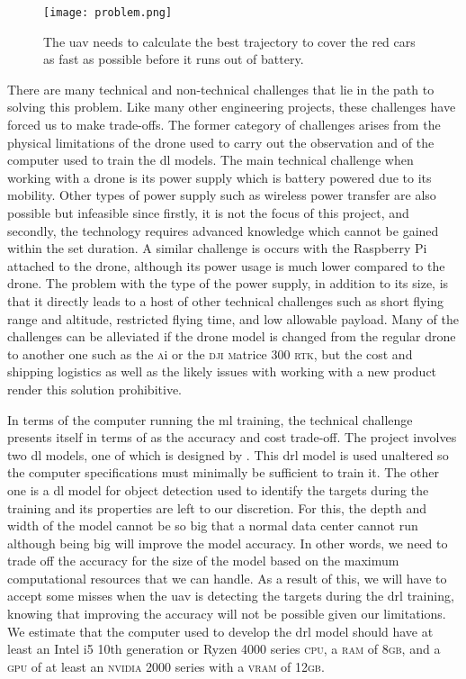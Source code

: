 \documentclass[../main.tex]{subfiles}
\begin{document}
\begin{figure}[tb] 
    \centering
    \texttt{[image: problem.png]} 
    \caption{The \gls{uav} needs to calculate 
    the best trajectory to cover the red cars
    as fast as possible before it runs out of battery.} 
    \label{fig:problem} 
\end{figure}

There are many technical and non-technical challenges
that lie in the path to solving this problem.
Like many other engineering projects,
these challenges have forced us to make trade-offs.
The former category of challenges arises 
from the physical limitations of the drone used to
carry out the observation
and of the computer used to train the \gls{dl} models.
The main technical challenge when working with a drone
is its power supply which is battery powered due to its mobility. 
Other types of power supply such as wireless power transfer
are also possible but infeasible since firstly, it is not the
focus of this project, and secondly, the technology requires 
advanced knowledge which cannot be gained within the set duration.
 A similar challenge is occurs with the Raspberry Pi attached
to the drone, although its power usage 
is much lower compared to the drone.
The problem with the type of the power supply, in addition to its size, 
 is that it directly leads to a host of other technical challenges
such as short flying range and altitude, restricted flying time,
and low allowable payload.
Many of the challenges can be alleviated if the drone model is changed
from the regular \anafi drone to another one such as 
the \anafi \textsc{a}i or the \textsc{dji} 
\textsc{m}atrice 300 \textsc{rtk},
but the cost and shipping logistics as well as
the likely issues with working with a new product
render this solution prohibitive.

In terms of the computer running the \gls{ml} training,
the technical challenge presents itself in terms of as 
the accuracy and cost trade-off.
The project involves two \gls{dl} models,
one of which is designed by \textcite{Ged21}.
This \gls{drl} model is used unaltered so 
the computer specifications must minimally be sufficient 
to train it.
The other one is a \gls{dl} model for object detection
used to identify the targets during the training
and its properties are left to our discretion.
For this, 
the depth and width of the model cannot be so big that
a normal data center cannot run although 
being big will improve
the model accuracy. In other words, we need to trade off
the accuracy for the size of the model 
based on the maximum computational resources that we can handle. 
As a result of this, we will have to accept some misses
when the \gls{uav} is detecting the targets during the 
\gls{drl} training, knowing that improving the accuracy 
will not be possible given our limitations.
We estimate that the computer used to develop the \gls{drl} model
should have at least an Intel i5 10th generation or
Ryzen 4000 series \textsc{cpu}, a \textsc{ram} of 8\textsc{gb}, 
and a \textsc{gpu} of at least an \textsc{nvidia} 2000 series
with a \textsc{vram} of 12\textsc{gb}.
\end{document}
